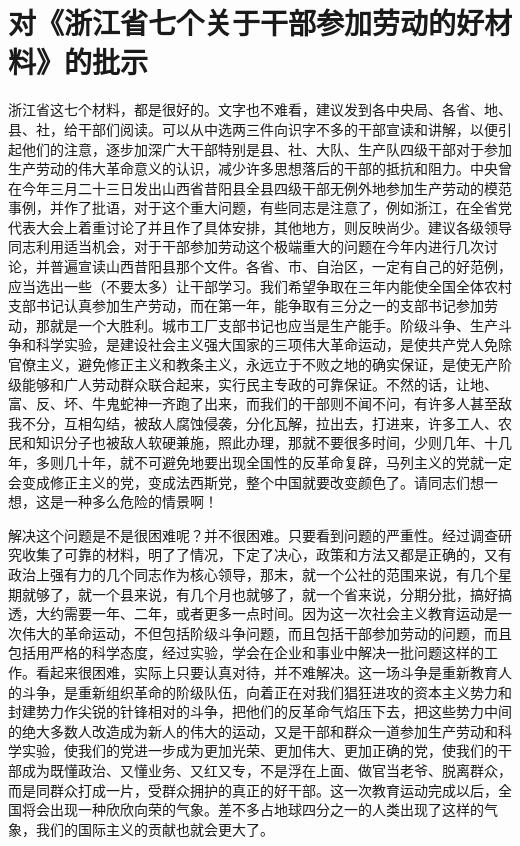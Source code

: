 \section[对《浙江省七个关于干部参加劳动的好材料》的批示（一九六三年五月九日）]{对《浙江省七个关于干部参加劳动的好材料》的批示}


浙江省这七个材料，都是很好的。文字也不难看，建议发到各中央局、各省、地、县、社，给干部们阅读。可以从中选两三件向识字不多的干部宣读和讲解，以便引起他们的注意，逐步加深广大干部特别是县、社、大队、生产队四级干部对于参加生产劳动的伟大革命意义的认识，减少许多思想落后的干部的抵抗和阻力。中央曾在今年三月二十三日发出山西省昔阳县全县四级干部无例外地参加生产劳动的模范事例，并作了批语，对于这个重大问题，有些同志是注意了，例如浙江，在全省党代表大会上着重讨论了并且作了具体安排，其他地方，则反映尚少。建议各级领导同志利用适当机会，对于干部参加劳动这个极端重大的问题在今年内进行几次讨论，并普遍宣读山西昔阳县那个文件。各省、市、自治区，一定有自己的好范例，应当选出一些（不要太多）让干部学习。我们希望争取在三年内能使全国全体农村支部书记认真参加生产劳动，而在第一年，能争取有三分之一的支部书记参加劳动，那就是一个大胜利。城市工厂支部书记也应当是生产能手。阶级斗争、生产斗争和科学实验，是建设社会主义强大国家的三项伟大革命运动，是使共产党人免除官僚主义，避免修正主义和教条主义，永远立于不败之地的确实保证，是使无产阶级能够和广人劳动群众联合起来，实行民主专政的可靠保证。不然的话，让地、富、反、坏、牛鬼蛇神一齐跑了出来，而我们的干部则不闻不问，有许多人甚至敌我不分，互相勾结，被敌人腐蚀侵袭，分化瓦解，拉出去，打进来，许多工人、农民和知识分子也被敌人软硬兼施，照此办理，那就不要很多时间，少则几年、十几年，多则几十年，就不可避免地要出现全国性的反革命复辟，马列主义的党就一定会变成修正主义的党，变成法西斯党，整个中国就要改变颜色了。请同志们想一想，这是一种多么危险的情景啊！

解决这个问题是不是很困难呢？并不很困难。只要看到问题的严重性。经过调查研究收集了可靠的材料，明了了情况，下定了决心，政策和方法又都是正确的，又有政治上强有力的几个同志作为核心领导，那末，就一个公社的范围来说，有几个星期就够了，就一个县来说，有几个月也就够了，就一个省来说，分期分批，搞好搞透，大约需要一年、二年，或者更多一点时间。因为这一次社会主义教育运动是一次伟大的革命运动，不但包括阶级斗争问题，而且包括干部参加劳动的问题，而且包括用严格的科学态度，经过实验，学会在企业和事业中解决一批问题这样的工作。看起来很困难，实际上只要认真对待，并不难解决。这一场斗争是重新教育人的斗争，是重新组织革命的阶级队伍，向着正在对我们猖狂进攻的资本主义势力和封建势力作尖锐的针锋相对的斗争，把他们的反革命气焰压下去，把这些势力中间的绝大多数人改造成为新人的伟大的运动，又是干部和群众一道参加生产劳动和科学实验，使我们的党进一步成为更加光荣、更加伟大、更加正确的党，使我们的干部成为既懂政治、又懂业务、又红又专，不是浮在上面、做官当老爷、脱离群众，而是同群众打成一片，受群众拥护的真正的好干部。这一次教育运动完成以后，全国将会出现一种欣欣向荣的气象。差不多占地球四分之一的人类出现了这样的气象，我们的国际主义的贡献也就会更大了。

